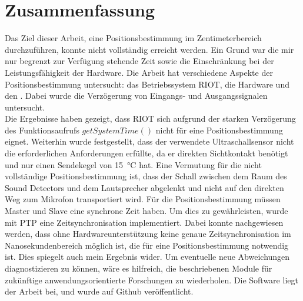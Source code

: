 \newpage
\section{Zusammenfassung}

Das Ziel dieser Arbeit, eine Positionsbestimmung im Zentimeterbereich durchzuführen, konnte nicht vollständig erreicht werden. Ein Grund war die mir nur begrenzt zur Verfügung stehende Zeit sowie die Einschränkung bei der Leistungsfähigkeit der Hardware.
Die Arbeit hat verschiedene Aspekte der Positionsbestimmung untersucht: das Betriebssystem RIOT, die Hardware \microphone \platz und den \ultraschall. Dabei wurde die Verzögerung von Eingangs- und Ausgangssignalen untersucht.
\\
Die Ergebnisse haben gezeigt, dass RIOT sich aufgrund der starken Verzögerung des Funktionsaufrufs $getSystemTime()$ nicht für eine Positionsbestimmung eignet. Weiterhin wurde festgestellt, dass der verwendete Ultraschallsensor nicht die erforderlichen Anforderungen erfüllte, da er direkten Sichtkontakt benötigt und nur einen Sendekegel von \SI{15}{\degreeCelsius} hat. Eine Vermutung für die nicht vollständige Positionsbestimmung ist, dass der Schall zwischen dem Raum des Sound Detectors und dem Lautsprecher abgelenkt und nicht auf den direkten Weg zum Mikrofon transportiert wird. Für die Positionsbestimmung müssen Master und Slave eine synchrone Zeit haben. Um dies zu gewährleisten, wurde mit PTP eine Zeitsynchronisation implementiert. Dabei konnte nachgewiesen werden, dass ohne Hardwareunterstützung keine genaue Zeitsynchronisation im Nanosekundenbereich möglich ist, die für eine Positionsbestimmung notwendig ist. Dies spiegelt auch mein Ergebnis wider. Um eventuelle neue Abweichungen diagnostizieren zu können, wäre es hilfreich, die beschriebenen Module für zukünftige anwendungsorientierte Forschungen zu wiederholen. Die Software liegt der Arbeit bei, und wurde auf Github \cite{src_GITHUB_CODE_BA} veröffentlicht.

